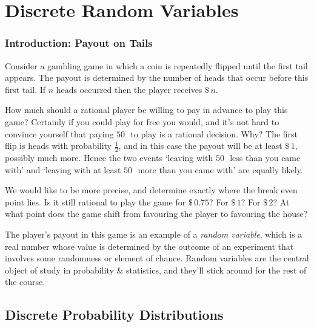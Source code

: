 \pagestyle{headings}
\chapter{Discrete Random Variables} \label{chp 3}
\thispagestyle{fancy}

\subsection*{Introduction: Payout on Tails}
Consider a gambling game in which a coin is repeatedly flipped until the first tail appears. The payout is determined by the number of heads that occur before this first tail. If $n$ heads occurred then the player receives $\$\,n$.

\par
How much should a rational player be willing to pay in advance to play this game? Certainly if you could play for free you would, and it's not hard to convince yourself that paying $50$\,\textcent\ to play is a rational decision. Why? The first flip is heads with probability $\frac{1}{2}$, and in this case the payout will be at least $\$\,1$, possibly much more. Hence the two events `leaving with $50$\,\textcent\ less than you came with' and `leaving with at least $50$\,\textcent\ more than you came with' are equally likely.
\par
We would like to be more precise, and determine exactly where the break even point lies. Is it still rational to play the game for $\$\,0.75$? For $\$\,1$? For $\$\,2$? At what point does the game shift from favouring the player to favouring the house?
\par
The player's payout in this game is an example of a \emph{random variable}, which is a real number whose value is determined by the outcome of an experiment that involves some randomness or element of chance. Random variables are the central object of study in probability \& statistics, and they'll stick around for the rest of the course.
\newpage

\section{Discrete Probability Distributions} \label{sec 3.1}

